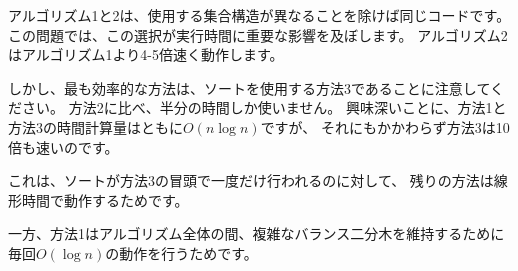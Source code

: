 アルゴリズム1と2は、使用する集合構造が異なることを除けば同じコードです。
この問題では、この選択が実行時間に重要な影響を及ぼします。
アルゴリズム2はアルゴリズム1より4-5倍速く動作します。

しかし、最も効率的な方法は、ソートを使用する方法3であることに注意してください。
方法2に比べ、半分の時間しか使いません。
興味深いことに、方法1と方法3の時間計算量はともに$O(n \log n)$ですが、
それにもかかわらず方法3は10倍も速いのです。

これは、ソートが方法3の冒頭で一度だけ行われるのに対して、
残りの方法は線形時間で動作するためです。

一方、方法1はアルゴリズム全体の間、複雑なバランス二分木を維持するために
毎回$O(\log n)$の動作を行うためです。